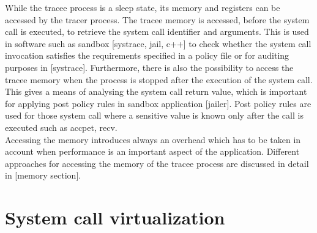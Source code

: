 While the tracee process is a sleep state, its memory and registers can be accessed by the tracer process. The tracee memory is accessed, before the system call is executed, to retrieve the system call identifier and arguments. This is used in software such as sandbox [systrace, jail, c++] to check whether the system call invocation satisfies the requirements specified in a policy file or for auditing purposes in [systrace]. Furthermore, there is also the possibility to access the tracee memory when the process is stopped after the execution of the system call. This gives a means of analysing the system call return value, which is important for applying post policy rules in sandbox application [jailer]. Post policy rules are used for those system call where a sensitive value is known only after the call is executed such as accpet, recv.  \\
Accessing the memory introduces always an overhead which has to be taken in account when performance is an important aspect of the application. Different approaches for accessing the memory of the tracee process are discussed in detail in [memory section].  \\


\section{System call virtualization}

